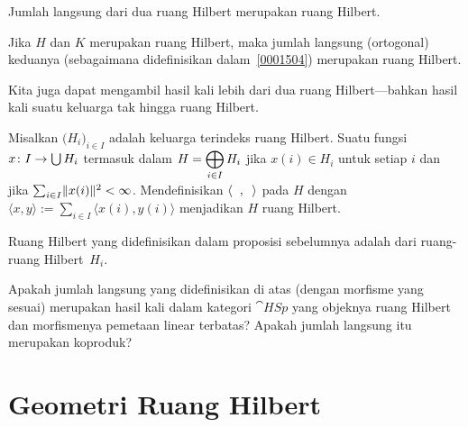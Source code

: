 Jumlah langsung dari dua ruang Hilbert merupakan ruang Hilbert.

\begin{prop} Jika $H$ dan $K$ merupakan ruang Hilbert, maka jumlah langsung (ortogonal) keduanya (sebagaimana didefinisikan dalam~\ref{0001504})
merupakan ruang Hilbert.
\end{prop}

Kita juga dapat mengambil hasil kali lebih dari dua ruang Hilbert---bahkan hasil kali suatu keluarga tak hingga ruang Hilbert.

\begin{prop} Misalkan $\bigl(H_i\bigr)_{i \in I}$ adalah keluarga terindeks ruang Hilbert.  Suatu fungsi $x\colon I \rightarrow \bigcup H_i$
termasuk dalam $H = \displaystyle\bigoplus_{i \in I}H_i$ jika $x(i) \in H_i$ untuk setiap $i$ dan jika $\sum_{i \in I}\lVert x(i)\rVert^2 < \infty$.
Mendefinisikan $\langle \hphantom x, \hphantom y \rangle$ pada $H$ dengan $\langle x, y \rangle := \sum_{i \in I} \langle
x(i), y(i) \rangle$ menjadikan $H$ ruang Hilbert.
\end{prop}

\begin{defn} Ruang Hilbert yang didefinisikan dalam proposisi sebelumnya adalah
 dari ruang-ruang Hilbert~$H_i$.
\end{defn}

\begin{exer}  Apakah jumlah langsung yang didefinisikan di atas (dengan morfisme yang sesuai) merupakan hasil kali dalam kategori $\cat{HSp}$
yang objeknya ruang Hilbert dan morfismenya pemetaan linear terbatas?  Apakah jumlah langsung itu merupakan koproduk?
\end{exer}


























\section{Geometri Ruang Hilbert}

